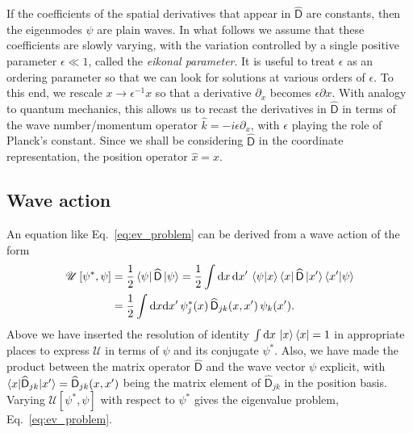 If the coefficients of the spatial derivatives that appear in $\widehat{\mathsf{D}}$ are constants, then the eigenmodes $\psi$ are plain waves.
In what follows we assume that these coefficients are slowly varying, with the variation controlled by a single positive parameter $\epsilon \ll 1$, called the \emph{eikonal parameter}.
It is useful to treat $\epsilon$ as an ordering parameter so that we can look for solutions at various orders of $\epsilon$.
To this end, we rescale $x \to \epsilon^{-1}x$ so that a derivative $\partial_{x}$ becomes $\epsilon \partial x$.
With analogy to quantum mechanics, this allows us to recast the derivatives in $\widehat{\mathsf{D}}$ in terms of the wave number/momentum operator $\hat{k} = -i\epsilon \partial_{x}$, with $\epsilon$ playing the role of Planck's constant.
Since we shall be considering $\widehat{\mathsf{D}}$ in the coordinate representation, the position operator $\hat{x} = x$.

\subsection{Wave action}

An equation like Eq.~\eqref{eq:ev_problem} can be derived from a wave action of the form
%
\begin{equation}
  \begin{aligned}
    \mathscr{U}\left[\psi^{*}, \psi\right] &= \frac{1}{2}\mathinner{\langle{\psi}\rvert}\widehat{\mathsf{D}}\mathinner{\lvert{\psi}\rangle}
  = \frac{1}{2}\int \mathrm{d}{x}\,\mathrm{d}{x'}\, \mathinner{\langle{\psi|x}\rangle}\mathinner{\langle{x}\rvert}\widehat{\mathsf{D}}\mathinner{\lvert{x'}\rangle}\mathinner{\langle{x'|\psi}\rangle}\\
                                           &= \frac{1}{2}\int \mathrm{d}{x}\mathrm{d}{x'}\, \psi^{*}_{j}(x)\,\widehat{\mathsf{D}}_{jk}(x, x')\,\psi_{k}(x').
  \label{eq:wave_action}
  \end{aligned}
\end{equation}
%
Above we have inserted the resolution of identity $\int \mathrm{d}{x}\,\mathinner{\lvert{x}\rangle}\mathinner{\langle{x}\rvert} = 1$ in appropriate places to express $\mathscr{U}$ in terms of $\psi$ and its conjugate $\psi^{*}$.
Also, we have made the product between the matrix operator $\widehat{\mathsf{D}}$ and the wave vector $\psi$ explicit, with $\mathinner{\langle{x|\widehat{\mathsf{D}}_{jk}|x'}\rangle} = \widehat{\mathsf{D}}_{jk}(x, x')$ being the matrix element of $\widehat{\mathsf{D}}_{jk}$ in the position basis.
Varying $\mathscr{U}[\psi^{*}, \psi]$ with respect to $\psi^{*}$ gives the eigenvalue problem, Eq.~\eqref{eq:ev_problem}.

